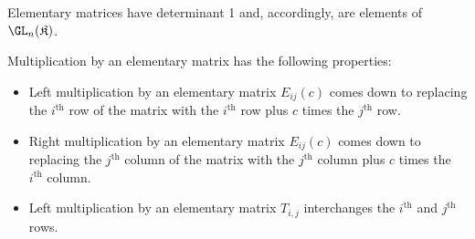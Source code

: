     \begin{property}[Invertibility]
        Elementary matrices have determinant 1 and, accordingly, are elements of $\GL_n(\mathfrak{K})$.
    \end{property}
    \begin{property}
        Multiplication by an elementary matrix has the following properties:
        \begin{itemize}
            \item Left multiplication by an elementary matrix $E_{ij}(c)$ comes down to replacing the $i^{\text{th}}$ row of the matrix with the $i^{\text{th}}$ row plus $c$ times the $j^{\text{th}}$ row.
            \item Right multiplication by an elementary matrix $E_{ij}(c)$ comes down to replacing the $j^{\text{th}}$ column of the matrix with the $j^{\text{th}}$ column plus $c$ times the $i^{\text{th}}$ column.
            \item Left multiplication by an elementary matrix $T_{i,j}$ interchanges the $i^{\text{th}}$ and $j^{\text{th}}$ rows.
        \end{itemize}
    \end{property}

